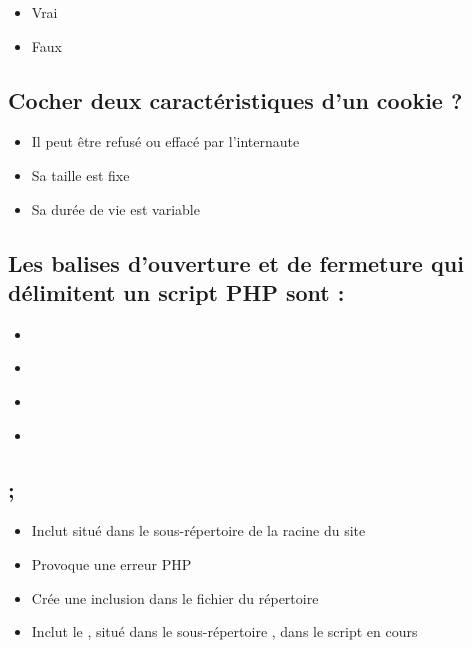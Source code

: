 \documentclass[11pt,a4paper]{article}
\begin{document}
\begin{itemize}
\item[\CaseCoche] Vrai \\
\item[\CaseCoche] Faux \\
\end{itemize}


\subsection{Cocher deux caractéristiques d'un cookie ?}

\begin{itemize}
\item[\CaseCoche] Il peut être refusé ou effacé par l'internaute \\
\item[\CaseCoche] Sa taille est fixe \\
\item[\CaseCoche] Sa durée de vie est variable \\
\end{itemize}


\newpage

\MakeStudentName

\subsection{Les balises d'ouverture et de fermeture qui délimitent un script PHP sont :}

\begin{itemize}
\item[\CaseCoche]  \\
\item[\CaseCoche]  \\
\item[\CaseCoche]  \\
\item[\CaseCoche]  \\
\end{itemize}


\subsection{;}

\begin{itemize}
\item[\CaseCoche] Inclut  situé dans le sous-répertoire  de la racine du site \\
\item[\CaseCoche] Provoque une erreur PHP \\
\item[\CaseCoche] Crée une inclusion dans le fichier  du répertoire  \\
\item[\CaseCoche] Inclut le , situé dans le sous-répertoire , dans le script en cours \\
\end{itemize}
\end{document}
